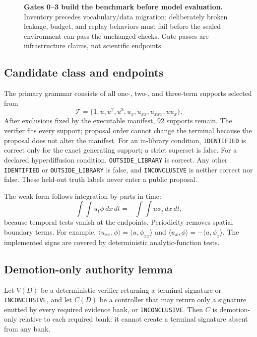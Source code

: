 \documentclass{article}
\newcommand{\ID}{\texttt{IDENTIFIED}\xspace}
\newcommand{\OUT}{\texttt{OUTSIDE\_LIBRARY}\xspace}
\newcommand{\INC}{\texttt{INCONCLUSIVE}\xspace}
\begin{document}
\begin{figure}[t]
\centering
\resizebox{\linewidth}{!}{}
\caption{\textbf{Gates 0--3 build the benchmark before model evaluation.} Inventory precedes
vocabulary/data migration; deliberately broken leakage, budget, and replay behaviors must fail
before the sealed environment can pass the unchanged checks. Gate passes are infrastructure
claims, not scientific endpoints.}
\label{fig:gates}
\end{figure}

\subsection{Candidate class and endpoints}
The primary grammar consists of all one-, two-, and three-term supports selected from
\[
\mathcal T=\{1,u,u^2,u^3,u_x,u_{xx},u_{xxx},uu_x\}.
\]
After exclusions fixed by the executable manifest, 92 supports remain. The verifier fits every
support; proposal order cannot change the terminal because the proposal does not alter the
manifest. For an in-library condition, \ID is correct only for the exact generating support; a strict
superset is false. For a declared hyperdiffusion condition, \OUT is correct. Any other \ID or
\OUT is false, and \INC is neither correct nor false. These held-out truth labels never enter a public
proposal.

The weak form follows integration by parts in time:
\[
\int\!\!\int u_t\phi\,dx\,dt=-\int\!\!\int u\phi_t\,dx\,dt,
\]
because temporal tests vanish at the endpoints. Periodicity removes spatial boundary terms. For
example, $\langle u_{xx},\phi\rangle=\langle u,\phi_{xx}\rangle$ and
$\langle u_x,\phi\rangle=-\langle u,\phi_x\rangle$. The implemented signs are covered by
deterministic analytic-function tests.

\subsection{Demotion-only authority lemma}
Let $V(D)$ be a deterministic verifier returning a terminal signature or \INC, and let
$C(D)$ be a controller that may return only a signature emitted by every required evidence bank,
or \INC. Then $C$ is demotion-only relative to each required bank: it cannot create a terminal
signature absent from any bank.
\end{document}
